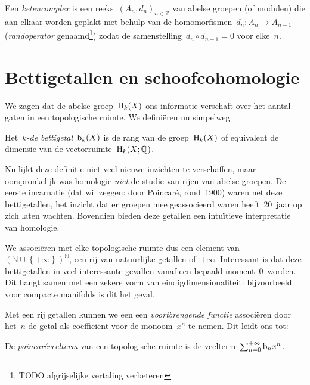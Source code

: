\documentclass[a4paper,11pt,openany,oneside,article]{memoir}
\begin{document}
\begin{definition}
  Een \emph{ketencomplex} is een reeks~$(A_n,d_n)_{n\in\mathbb{Z}}$ van abelse groepen (of modulen) die aan elkaar worden geplakt met behulp van de homomorfismen~$d_n\colon A_n\to A_{n-1}$ (\emph{randoperator} genaamd\footnote{TODO afgrijselijke vertaling verbeteren}) zodat de samenstelling~$d_n\circ d_{n+1}=0$ voor elke~$n$.
\end{definition}



\section{Bettigetallen en schoofcohomologie}
\label{section:betti-numbers}
We zagen dat de abelse groep~$\mathrm{H}_k(X)$ ons informatie verschaft over het aantal gaten in een topologische ruimte. We defini\"eren nu simpelweg:
\begin{definition}
  Het~\emph{$k$\nobreakdash-de bettigetal~$\mathrm{b}_k(X)$} is de rang van de groep~$\mathrm{H}_k(X)$ of equivalent de dimensie van de vectorruimte~$\mathrm{H}_k(X;\mathbb{Q})$.
\end{definition}

Nu lijkt deze definitie niet veel nieuwe inzichten te verschaffen, maar oorspronkelijk was homologie \emph{niet} de studie van rijen van abelse groepen. De eerste incarnatie (dat wil zeggen: door Poincar\'e, rond~1900) waren net deze bettigetallen, het inzicht dat er groepen mee geassocieerd waren heeft~$20$~jaar op zich laten wachten. Bovendien bieden deze getallen een intu\"itieve interpretatie van homologie.

We associ\"eren met elke topologische ruimte dus een element van~$(\mathbb{N}\cup\left\{ +\infty \right\})^\mathbb{N}$, een rij van natuurlijke getallen of~$+\infty$. Interessant is dat deze bettigetallen in veel interessante gevallen vanaf een bepaald moment~$0$~worden. Dit hangt samen met een zekere vorm van eindigdimensionaliteit: bijvoorbeeld voor compacte manifolds is dit het geval.

Met een rij getallen kunnen we een een \emph{voortbrengende functie} associ\"eren door het~$n$\nobreakdash-de getal als co\"effici\"ent voor de monoom~$x^n$ te nemen. Dit leidt ons tot:

\begin{definition}
  De \emph{poincar\'eveelterm} van een topologische ruimte is de veelterm~$\sum_{n=0}^{+\infty}\mathrm{b}_n x^n$.
\end{definition}
\end{document}
